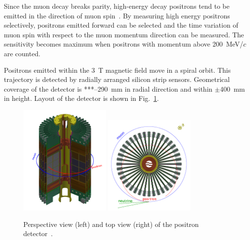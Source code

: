 Since the muon decay breaks parity, high-energy decay positrons tend to be emitted
in the direction of muon spin~\cite{Michel}. By measuring high energy positrons
selectively, positrons emitted forward can be selected and
the time variation of muon spin with respect to the muon momentum direction
can be measured. The sensitivity becomes maximum when positrons
with momentum above 200~MeV/$c$ are counted.

Positrons emitted within the 3~T magnetic field move in a spiral orbit.
This trajectory is detected by radially arranged silicon strip sensors.
Geometrical coverage of the detector is ***--290~mm in radial direction and within $\pm$400~mm
in height. Layout of the detector is shown in 
Fig.~\ref{fig:Detector_overview}. 

\begin{figure}[t]
  \begin{center}
    \includegraphics[width=0.4\textwidth, bb=0 0 393 511]{Fig/Detector_cutview.png}
    \includegraphics[width=0.4\textwidth, bb=0 0 337 369]{Fig/Detector_topview.png}
    \caption{Perspective view (left) and top view (right) of the positron detector~\cite{TDRsummarypaper}.}
    \label{fig:Detector_overview}
  \end{center}
\end{figure}

